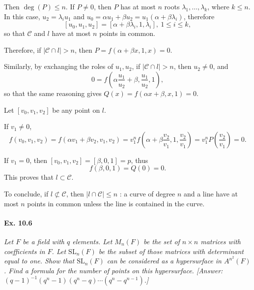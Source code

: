 \documentclass[11pt,a4paper]{article}
\begin{document}
Then $\deg(P) \leq n$. If $P \ne 0$, then $P$ has at most $n$ roots $\lambda_1,\ldots,\lambda_k$, where $k\leq n$. In this case, $u_2 = \lambda_i u_1$ and $u_0  =\alpha u_1 + \beta u_2 = u_1\left(\alpha + \beta \lambda_i\right)$, therefore
$$[u_0,u_1,u_2]  =\left [\alpha + \beta \lambda_i, 1 , \lambda_i \right],\ 1\leq i \leq k,$$ 
so that $\mathscr{C}$ and $l$ have at most $n$ points in common.

Therefore, if $|\mathscr {C} \cap l| >n$, then $P =  f\left(\alpha + \beta x,1,x\right) = 0$.

Similarly, by exchanging the roles of $u_1,u_2$, if $|\mathscr {C} \cap l| >n$, then $u_2 \ne 0$, and
$$0 = f\left (\alpha \frac{u_1}{u_2} + \beta, \frac{u_1}{u_2}, 1\right ),$$
so that the same reasoning gives $Q(x) = f(\alpha x + \beta, x ,1) = 0$.

 Let $[v_0,v_1,v_2]$ be any point on $l$. 
 
 If $v_1 \ne 0$,
$$f(v_0,v_1,v_2) = f(\alpha v_1 + \beta v_2, v_1,v_2) = v_1^n f\left(\alpha + \beta \frac{v_2}{v_1}, 1 ,\frac{v_2}{v_1}\right) = v_1^n P\left (\frac{v_2}{v_1} \right) = 0.$$

If $v_1 = 0$, then $[v_0,v_1,v_2] = [\beta, 0,1] = p$, thus
$$f(\beta,0,1) = Q(0) =0.$$
This proves that $l \subset \mathscr{C}$.

To conclude, if $l \not \subset \mathscr {C}$, then $|l \cap \mathscr{C}| \leq n$ : a curve of degree $n$ and a line have at most $n$ points in common unless the line is contained in the curve.

\paragraph{Ex. 10.6} {\it Let $F$ be a field with $q$ elements. Let $M_n(F)$ be the set of $n \times n$ matrices with coefficients in $F$. Let $\mathrm{SL}_n(F)$ be the subset of those matrices with determinant equal to one. Show that $\mathrm{SL}_n(F)$ can be considered as a hypersurface in $A^{n^2}(F)$. Find a formula for the number of points on this hypersurface. [Answer:$(q-1)^{-1}(q^n-1)(q^n-q)\cdots(q^n-q^{n-1})$.]
}
\end{document}
